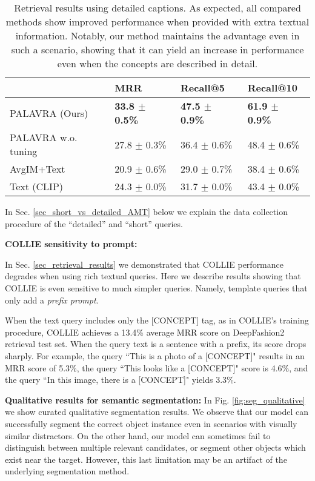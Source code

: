 \documentclass[runningheads]{llncs}
\newcommand{\secref}[1]{Sec. \ref{#1}}
\newcommand{\concept}{[CONCEPT]}
\begin{document}
\setlength{\tabcolsep}{4pt}
\begin{table}[htbp]
\centering
    \begin{tabular}{llll}
    \toprule
    {} &               MRR &          Recall@5 &         Recall@10 \\
    \midrule
    PALAVRA (Ours)      &  \textbf{33.8 $\pm$ 0.5\% } &  \textbf{47.5 $\pm$ 0.9\% } &  \textbf{61.9 $\pm$ 0.9\%  } \\
    PALAVRA w.o. tuning &  27.8 $\pm$ 0.3\% &  36.4 $\pm$ 0.6\% &  48.4 $\pm$ 0.6\% \\
    AvgIM+Text          &  20.9 $\pm$ 0.6\% &  29.0 $\pm$ 0.7\% &  38.4 $\pm$ 0.6\% \\
    Text (CLIP)         &  24.3 $\pm$ 0.0\% &  31.7 $\pm$ 0.0\% &  43.4 $\pm$ 0.0\% \\
    \bottomrule
    \end{tabular}
    \vspace{2pt}
    \caption{Retrieval results using detailed captions. As expected, all compared methods show improved performance when provided with extra textual information. Notably, our method maintains the advantage even in such a scenario, showing that it can yield an increase in performance even when the concepts are described in detail.}
    \label{tab:long_captions}
\end{table}

In \secref{sec_short_vs_detailed_AMT} below we explain the data collection procedure of the ``detailed'' and ``short'' queries.

\vspace{15pt}\noindent\textbf{COLLIE sensitivity to prompt:}

In \secref{sec_retrieval_results} we demonstrated that COLLIE performance degrades when using rich textual queries. Here we describe results showing that COLLIE is even sensitive to much simpler queries. Namely, template queries that only add a \textit{prefix prompt}.

When the text query includes only the \concept{} tag, as in COLLIE's training procedure, COLLIE achieves a 13.4\% average MRR score on DeepFashion2 retrieval test set. When the query text is a sentence with a prefix, its score drops sharply. For example, the query ``This is a photo of a \concept{}" results in an MRR score of 5.3\%,  the query ``This looks like a \concept{}" score is 4.6\%, and the query ``In this image, there is a \concept{}" yields 3.3\%.


\vspace{15pt}\noindent\textbf{Qualitative results for semantic segmentation:}
In Fig. \ref{fig:seg_qualitative} we show curated qualitative segmentation results. 
We observe that our model can successfully segment the correct object instance even in scenarios with visually similar distractors. On the other hand, our model can sometimes fail to distinguish between multiple relevant candidates, or segment other objects which exist near the target. However, this last limitation may be an artifact of the underlying segmentation method. 
\end{document}
